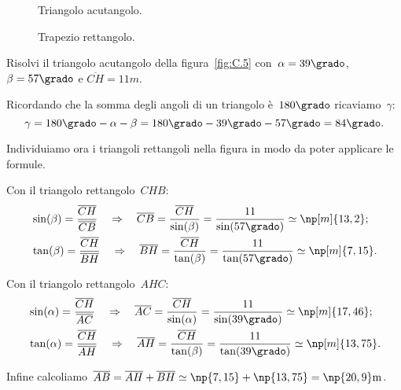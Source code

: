 \begin{figure}[b]
\begin{minipage}[t]{.45\textwidth}
 \centering
 
 \caption{Triangolo acutangolo.}\label{fig:C.5}
\end{minipage}\hfil
\begin{minipage}[t]{.45\textwidth}
\centering
 
\caption{Trapezio rettangolo.}\label{fig:C.6}
\end{minipage}
 \end{figure}

\begin{exrig}
 \begin{esempio}
Risolvi il triangolo acutangolo della figura~\ref{fig:C.5} con~$\alpha=39\grado$, $\beta=57\grado$ e $\overline{CH}=11\unit{m}$.

Ricordando che la somma degli angoli di un triangolo è~$180\grado$ ricaviamo~$\gamma$:
\[ \gamma =180\grado-\alpha -\beta =180\grado-39\grado-57\grado=84\grado.\]

Individuiamo ora i triangoli rettangoli nella figura in modo da poter applicare le formule.

Con il triangolo rettangolo~$CHB$:
\begin{align*}
 &\sin(\beta)=\frac{\overline{CH}}{\overline{CB}} \quad\Rightarrow\quad \overline{CB}=\frac{\overline{CH}}{\sin(\beta)}=
    \frac{11}{\sin(57\grado)}\simeq \np[m]{13,2};\\
&\tan(\beta)=\frac{\overline{CH}}{\overline{BH}} \quad\Rightarrow\quad \overline{BH}=\frac{\overline{CH}}{\tan(\beta)}=
    \frac{11}{\tan(57\grado)}\simeq \np[m]{7,15}.
\end{align*}

Con il triangolo rettangolo~$AHC$:
\begin{align*}
&\sin(\alpha)=\frac{\overline{CH}}{\overline{AC}} \quad\Rightarrow\quad \overline{AC}=\frac{\overline{CH}}{\sin(\alpha)}=
    \frac{11}{\sin(39\grado)}\simeq \np[m]{17,46};\\
&\tan(\alpha)=\frac{\overline{CH}}{\overline{AH}} \quad\Rightarrow\quad \overline{AH}=\frac{\overline{CH}}{\tan(\beta)}=
    \frac{11}{\tan(39\grado)}\simeq \np[m]{13,75}.
\end{align*}

Infine calcoliamo~$\overline{AB}=\overline{AH}+\overline{BH}\simeq \np{7,15}+\np{13,75} = \np{20,9}\unit{m}$.
 \end{esempio}
\end{exrig}

